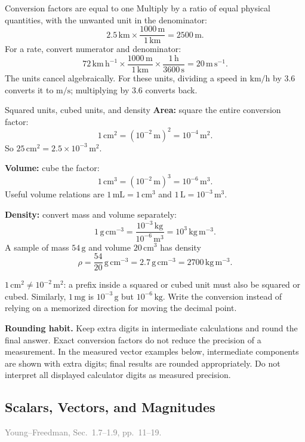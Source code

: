\documentclass[11pt,letterpaper]{article}
\newcommand{\unit}[1]{\,\mathrm{#1}}
\newcommand{\bookref}[2]{\textcolor{gray}{\footnotesize Young--Freedman, Sec.~#1, pp.~#2.}}
\begin{document}
\begin{rulebox}{Conversion factors are equal to one}
Multiply by a ratio of equal physical quantities, with the unwanted unit in the denominator:
\[
 2.5\unit{km}\times\frac{1000\unit{m}}{1\unit{km}}=2500\unit{m}.
\]
For a rate, convert numerator and denominator:
\[
 72\unit{km\,h^{-1}}\times\frac{1000\unit{m}}{1\unit{km}}
 \times\frac{1\unit{h}}{3600\unit{s}}
 =\boxed{20\unit{m\,s^{-1}}}.
\]
The units cancel algebraically. For these units, dividing a speed in $\mathrm{km/h}$ by 3.6 converts it to $\mathrm{m/s}$; multiplying by 3.6 converts back.
\end{rulebox}

\begin{examplebox}{Squared units, cubed units, and density}
\textbf{Area:} square the entire conversion factor:
\[
 1\unit{cm^2}=(10^{-2}\unit{m})^2=10^{-4}\unit{m^2}.
\]
So $25\unit{cm^2}=2.5\times10^{-3}\unit{m^2}$.

\textbf{Volume:} cube the factor:
\[
 1\unit{cm^3}=(10^{-2}\unit{m})^3=10^{-6}\unit{m^3}.
\]
Useful volume relations are $1\unit{mL}=1\unit{cm^3}$ and $1\unit{L}=10^{-3}\unit{m^3}$.

\textbf{Density:} convert mass and volume separately:
\[
 \boxed{1\unit{g\,cm^{-3}}=\frac{10^{-3}\unit{kg}}{10^{-6}\unit{m^3}}
 =10^3\unit{kg\,m^{-3}}.}
\]
A sample of mass $54\unit{g}$ and volume $20\unit{cm^3}$ has density
\[
 \rho=\frac{54}{20}\unit{g\,cm^{-3}}=2.7\unit{g\,cm^{-3}}
 =2700\unit{kg\,m^{-3}}.
\]
\end{examplebox}

\begin{watchbox}
$1\unit{cm^2}\ne10^{-2}\unit{m^2}$: a prefix inside a squared or cubed unit must also be squared or cubed. Similarly, $1\unit{mg}$ is $10^{-3}\unit{g}$ but $10^{-6}\unit{kg}$. Write the conversion instead of relying on a memorized direction for moving the decimal point.

\textbf{Rounding habit.} Keep extra digits in intermediate calculations and round the final answer. Exact conversion factors do not reduce the precision of a measurement. In the measured vector examples below, intermediate components are shown with extra digits; final results are rounded appropriately. Do not interpret all displayed calculator digits as measured precision.
\end{watchbox}

\subsection{Scalars, Vectors, and Magnitudes}
\bookref{1.7--1.9}{11--19}
\end{document}
